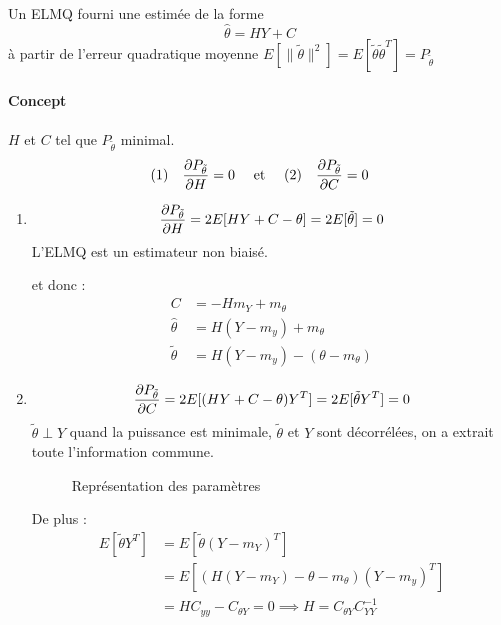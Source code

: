 \documentclass[main.tex]{subfiles}
\begin{document}
\begin{defin}
  Un ELMQ fourni une estimée de la forme
  \[
   \hat{\theta} = HY +C
 \]
  à partir de l'erreur quadratique moyenne $E[\|\tilde{\theta}\|^2] = E[\tilde{\theta}\tilde{\theta}^T] =P_{\tilde{\theta}}$
\end{defin}
\paragraph{Concept} $H$ et $C$ tel que $P_{\tilde{\theta}}$ minimal.
\[
(1) \quad  \derivp[P_{\tilde{\theta}}]{H} = 0 \quad\text{ et }\quad (2)\quad \derivp[P_{\tilde{\theta}}]{C} = 0
\]
\begin{enumerate}[label=\arabic*)]
\item

  \begin{prop}
  \[
    \derivp[P_{\tilde{\theta}}]{H} =2E[HY+C-\theta] = 2E[\tilde{\theta}] = 0
  \]
    L'ELMQ est un estimateur non biaisé.
  \end{prop}
  et donc :
  \begin{align*}
    C &= -Hm_Y+m_\theta\\
    \hat{\theta} &= H(Y-m_y)+m_\theta \\
    \tilde{\theta} &= H(Y-m_y) - (\theta-m_\theta)
  \end{align*}

\item
  \begin{prop}
      \[
    \derivp[P_{\tilde{\theta}}]{C} =2E[(HY+C-\theta)Y^T] = 2E[\tilde{\theta}Y^T] = 0
  \]
  $\tilde{\theta} \perp Y $ quand la puissance est minimale, $\tilde{\theta}$ et $Y$ sont décorrélées, on a extrait toute l'information commune.
  \end{prop}
  \begin{figure}[H]\centering

  \caption{Représentation des paramètres}
\end{figure}
  De plus :
  \begin{align*}
    E[\tilde{\theta}Y^T]& =E[\tilde{\theta}(Y-m_Y)^T] \\
                   &= E[(H(Y-m_Y)-\theta-m_\theta)(Y-m_y)^T]\\
                   &= HC_{yy}-C_{\theta Y} = 0 \implies H = C_{\theta Y}C_{YY}^{-1}
  \end{align*}


\end{enumerate}
\end{document}
